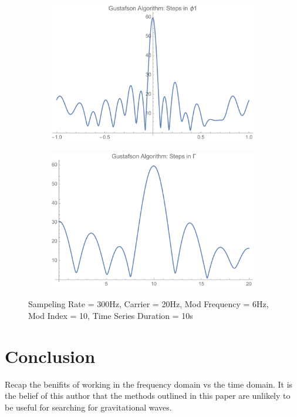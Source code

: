 \documentclass[onecolumn, groupedaddress, 10pt]{revtex4-1}
\begin{document}
\begin{figure}[t]
\begin{subfigure}{.5\textwidth}
  		\caption{}
	\end{subfigure}
	\begin{subfigure}{.5\textwidth}
  		\centering
  		\includegraphics[width=.9\linewidth]{gustafsonAlgoStepInPhi1.pdf}
  		\caption{}
	\end{subfigure}%
	\begin{subfigure}{.5\textwidth}
  		\centering
  		\includegraphics[width=.9\linewidth]{gustafsonAlgoStepInGamma.pdf}
  		\caption{}
	\end{subfigure}
	\caption{\label{fig:} Sampeling Rate = 300Hz, Carrier = 20Hz, Mod Frequency = 6Hz, Mod Index = 10, Time Series Duration = 10s}
\end{figure}


\section{Conclusion}
Recap the benifits of working in the frequency domain vs the time domain.
It is the belief of this author that the methods outlined in this paper are unlikely to be useful for searching for gravitational waves.  
\end{document}
